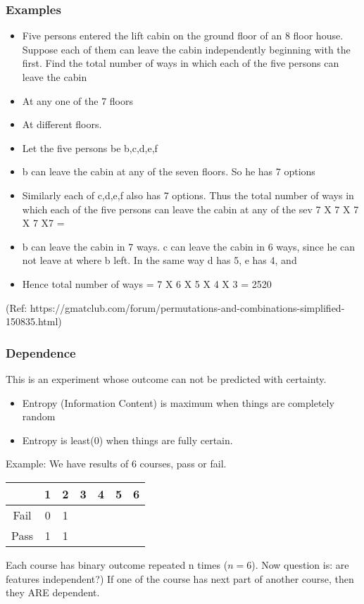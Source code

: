\begin{frame}[fragile]\frametitle{Examples}
\begin{itemize}
\item Five persons entered the lift cabin on the ground floor of an 8 floor house. Suppose each of them can leave the cabin independently
beginning with the first. Find the total number of ways in which each of the five persons can leave the cabin
 
\item At any one of the 7 floors
 
\item At different floors.
 
\item Let the five persons be b,c,d,e,f
 
\item b can leave the cabin at any of the seven floors. So he has 7 options
 
\item Similarly each of c,d,e,f also has 7 options. Thus the total number of ways in which each of the five persons can leave the cabin at any of the sev
7 X 7 X 7 X 7 X7 = 
 
\item b can leave the cabin in 7 ways. c can leave the cabin in 6 ways, since he can not leave at where b left. In the same way d has 5, e has 4, and 
\item  Hence total number of ways = 7 X 6 X 5 X 4 X 3 = 2520
 \end{itemize}
 
 (Ref: https://gmatclub.com/forum/permutations-and-combinations-simplified-150835.html)
\end{frame}

\begin{frame}[fragile]\frametitle{Dependence}
This is an experiment whose outcome can not be predicted with certainty.
\begin{itemize}
\item Entropy (Information Content) is maximum when things are completely random
\item Entropy is least(0) when things are fully certain.
\end{itemize}
Example: We have results of 6 courses, pass or fail.
    \begin{center}
        \begin{tabular}{|c|c|c|c|c|c|c|}
            \hline
             & 1 & 2 & 3& 4 & 5 & 6\\ \hline
             Fail & 0 & 1 & \\
             Pass & 1 & 1 \\
        \end{tabular}
    \end{center}
Each course has binary outcome repeated n times ($n=6$). Now question is: are features independent?)
If one of the course has next part of another course, then they ARE dependent.
\end{frame}

